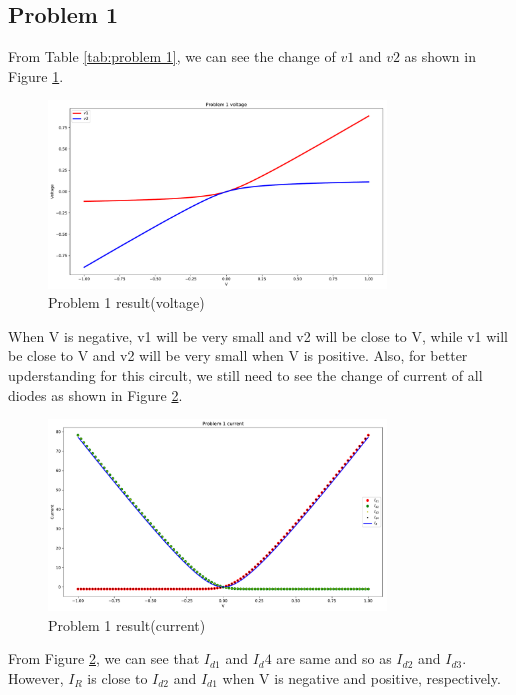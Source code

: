 \documentclass{article}
\begin{document}
\subsection{Problem 1}
\label{sec:p1}
From Table \ref{tab:problem 1}, we can see the change of $v1$ and $v2$ as shown in Figure \ref{fig:M1 volt}.
\begin{figure}[H]
    \centering
    \includegraphics[width=0.8\textwidth]{src/M1_voltage.pdf}
    \caption{Problem 1 result(voltage)}
    \label{fig:M1 volt}
\end{figure}
When V is negative, v1 will be very small and v2 will be close to V, while v1 will be close to V and v2 will be very small when V is positive.
Also, for better upderstanding for this circult, we still need to see the change of current of all diodes as shown in Figure \ref{fig:M1 current}.
\begin{figure}[H]
    \centering
    \includegraphics[width=0.8\textwidth]{src/M1_current.pdf}
    \caption{Problem 1 result(current)}
    \label{fig:M1 current}
\end{figure}
From Figure \ref{fig:M1 current}, we can see that $I_{d1}$ and $I_d{4}$ are same and so as $I_{d2}$ and $I_{d3}$. However, $I_R$ is close to 
$I_{d2}$ and $I_{d1}$ when V is negative and positive, respectively.
\end{document}
